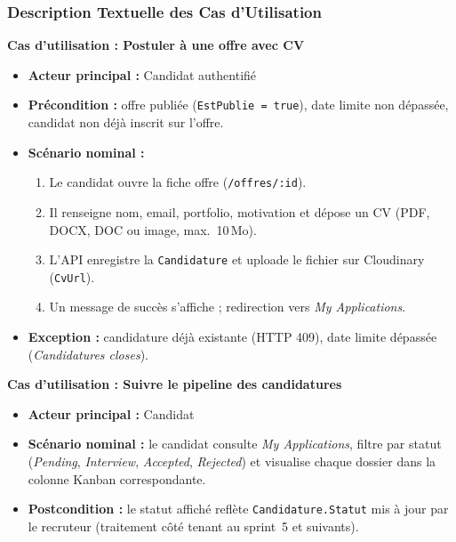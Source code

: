 \subsubsection{Description Textuelle des Cas d'Utilisation}

\textbf{Cas d'utilisation : Postuler à une offre avec CV}

\begin{itemize}
    \item \textbf{Acteur principal :} Candidat authentifié
    \item \textbf{Précondition :} offre publiée (\texttt{EstPublie = true}), date limite
    non dépassée, candidat non déjà inscrit sur l'offre.
    \item \textbf{Scénario nominal :}
    \begin{enumerate}
        \item Le candidat ouvre la fiche offre (\texttt{/offres/:id}).
        \item Il renseigne nom, email, portfolio, motivation et dépose un CV
        (PDF, DOCX, DOC ou image, max.\ 10\,Mo).
        \item L'API enregistre la \texttt{Candidature} et uploade le fichier sur
        Cloudinary (\texttt{CvUrl}).
        \item Un message de succès s'affiche ; redirection vers \textit{My Applications}.
    \end{enumerate}
    \item \textbf{Exception :} candidature déjà existante (HTTP 409), date limite
    dépassée (\textit{Candidatures closes}).
\end{itemize}

\textbf{Cas d'utilisation : Suivre le pipeline des candidatures}

\begin{itemize}
    \item \textbf{Acteur principal :} Candidat
    \item \textbf{Scénario nominal :} le candidat consulte \textit{My Applications},
    filtre par statut (\textit{Pending}, \textit{Interview}, \textit{Accepted},
    \textit{Rejected}) et visualise chaque dossier dans la colonne Kanban correspondante.
    \item \textbf{Postcondition :} le statut affiché reflète \texttt{Candidature.Statut}
    mis à jour par le recruteur (traitement côté tenant au sprint~5 et suivants).
\end{itemize}

